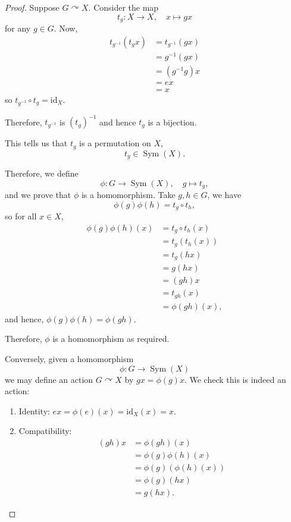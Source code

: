 \documentclass{article}
\theoremstyle{definition}
\theoremstyle{remark}
\newcommand{\pqty}[1]{\left(#1\right)}
\newcommand{\functiondomain}[3]{#1:#2\to #3}
\newcommand{\function}[5]{#1:#2\to #3,\quad #4\mapsto #5}
\newcommand{\inverse}{^{-1}}
\newcommand{\actson}{\curvearrowright}
\newcommand{\identity}{\mathrm{id}}
\newcommand{\Sym}{\operatorname{Sym}}
\begin{document}
\begin{proof}
    Suppose \(G \actson X\). Consider the map
    \[
        \function{t_g}{X}{X}{x}{gx}
    \]
    for any \(g \in G\). Now,
    \begin{align*}
        t_{g\inverse} \pqty{t_g x} &= t_{g\inverse} \pqty{gx} \\
        &= g\inverse \pqty{gx} \\
        &= \pqty{g\inverse g} x \\
        &= ex \\
        &= x
    \end{align*}
    so \(t_{g\inverse} \circ t_g = \identity_{X}\).

    Therefore, \(t_{g\inverse}\) is \(\pqty{t_g}\inverse\) and hence \(t_g\) is a bijection.

    This tells us that \(t_g\) is a permutation on \(X\),
    \[
        t_g \in \Sym\pqty{X}.
    \]

    Therefore, we define
    \[
        \function{\phi}{G}{\Sym\pqty{X}}{g}{t_{g},}
    \]
    and we prove that \(\phi\) is a homomorphism. Take \(g, h \in G\), we have
    \[
        \phi\pqty{g} \phi\pqty{h} = t_g \circ t_h,
    \]
    so for all \(x \in X\),
    \begin{align*}
        \phi\pqty{g} \phi\pqty{h} \pqty{x} &= t_g \circ t_h \pqty{x} \\
        &= t_g \pqty{t_h \pqty{x}} \\
        &= t_g \pqty{hx} \\
        &= g \pqty{hx} \\
        &= \pqty{gh} x \\
        &= t_{gh} \pqty{x} \\
        &= \phi\pqty{gh} \pqty{x},
    \end{align*}
    and hence, \(\phi\pqty{g} \phi\pqty{h} = \phi\pqty{gh}\).

    Therefore, \(\phi\) is a homomorphism as required.

    Conversely, given a homomorphism
    \[
        \functiondomain{\phi}{G}{\Sym\pqty{X}}
    \]
    we may define an action \(G \actson X\) by \(gx = \phi\pqty{g} x\). We check this is indeed an action:
    \begin{enumerate}
        \item Identity: \(ex = \phi\pqty{e} \pqty{x} = \identity_{X} \pqty{x} = x\).
        \item Compatibility:
        \begin{align*}
            \pqty{gh} x &= \phi\pqty{gh} \pqty{x} \\
            &= \phi\pqty{g} \phi\pqty{h} \pqty{x} \\
            &= \phi\pqty{g} \pqty{\phi\pqty{h} \pqty{x}} \\
            &= \phi\pqty{g} \pqty{hx} \\
            &= g \pqty{hx}.
        \end{align*}
    \end{enumerate}
\end{proof}
\end{document}
